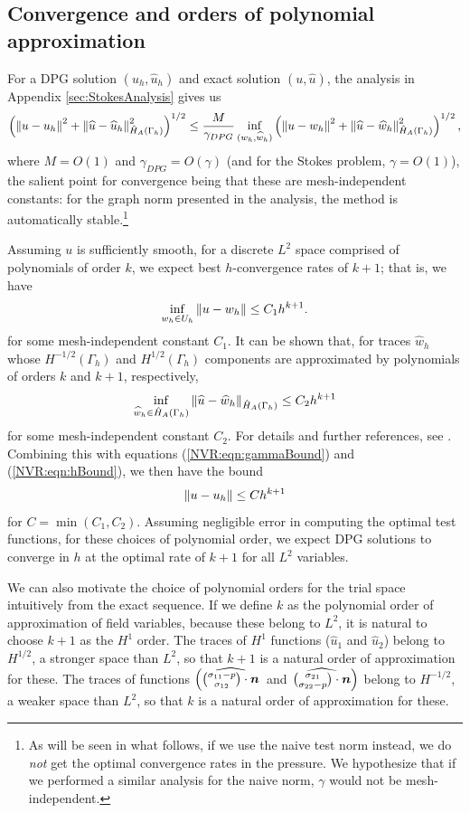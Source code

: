 \subsection{Convergence and orders of polynomial approximation}
For a DPG solution $(u_{h},\widehat{u}_{h})$ and exact solution $(u,\widehat{u})$, the analysis in Appendix \ref{sec:StokesAnalysis} gives us
\begin{align}\label{NVR:eqn:gammaBound}
\left(\norm{u-u_{h}}^{2} + \norm{\widehat{u}-\widehat{u}_{h}}_{\hat{H}_A(\Gamma_{h})}^{2}\right)^{1/2} \leq \frac{M}{\gamma_{DPG}} \inf_{(w_{h},\widehat{w}_{h})}\left(\norm{u-w_{h}}^{2} + \norm{\widehat{u}-\widehat{w}_{h}}_{\hat{H}_A(\Gamma_{h})}^{2}  \right)^{1/2},
\end{align}
where $M=O(1)$ and $\gamma_{DPG}=O(\gamma)$ (and for the Stokes problem, $\gamma=O(1)$), the salient point for convergence being that these are mesh-independent constants: for the graph norm presented in the analysis, the method is automatically stable.\footnote{As will be seen in what follows, if we use the naive test norm instead, we do \emph{not} get the optimal convergence rates in the pressure.  We hypothesize that if we performed a similar analysis for the naive norm, $\gamma$ would not be mesh-independent.}

Assuming $u$ is sufficiently smooth, for a discrete $L^2$ space comprised of polynomials of order $k$, we expect best $h$-convergence rates of $k+1$; that is, we have
\begin{align}
\inf_{w_{h} \in U_{h}} \norm{u-w_{h}} \leq C_{1} h^{k+1}.\label{NVR:eqn:hBound}
\end{align}
for some mesh-independent constant $C_{1}$.  It can be shown that, for traces $\widehat{w}_{h}$ whose $H^{-1/2}(\Gamma_{h})$ and $H^{1/2}(\Gamma_{h})$ components are approximated by polynomials of orders $k$ and $k+1$, respectively,
\[
\inf_{\widehat{w}_{h} \in \hat{H}_A(\Gamma_{h})} \norm{\widehat{u}-\widehat{w}_{h}}_{\hat{H}_A(\Gamma_{h})} \leq C_{2} h^{k+1}
\]
for some mesh-independent constant $C_{2}$.  For details and further references, see \cite[pp. 7-8]{DPG6}. Combining this with equations (\ref{NVR:eqn:gammaBound}) and (\ref{NVR:eqn:hBound}), we then have the bound
\[
\norm{u-u_{h}} \leq C h^{k+1}
\]
for $C = \min(C_{1}, C_{2})$.
Assuming negligible error in computing the optimal test functions, for these choices of polynomial order, we expect DPG solutions to converge in $h$ at the optimal rate of $k+1$ for all $L^{2}$ variables.

We can also motivate the choice of polynomial orders for the trial space intuitively from the exact sequence.  If we define $k$ as the polynomial order of approximation of field variables, because these belong to $L^{2}$, it is natural to choose $k+1$ as the $H^{1}$ order.  The traces of $H^{1}$ functions ($\widehat{u}_{1}$ and $\widehat{u}_{2}$) belong to $H^{1/2}$, a stronger space than $L^{2}$, so that $k+1$ is a natural order of approximation for these.  The traces of \NVRHdiv  functions $\left(\widehat{{\sigma_{11} - p \choose \sigma_{12}} \cdot \vect{n}}\right.$ and $\left.\widehat{{\sigma_{21}  \choose \sigma_{22} - p} \cdot \vect{n}}\right)$ belong to $H^{-1/2}$, a weaker space than $L^{2}$, so that $k$ is a natural order of approximation for these.

